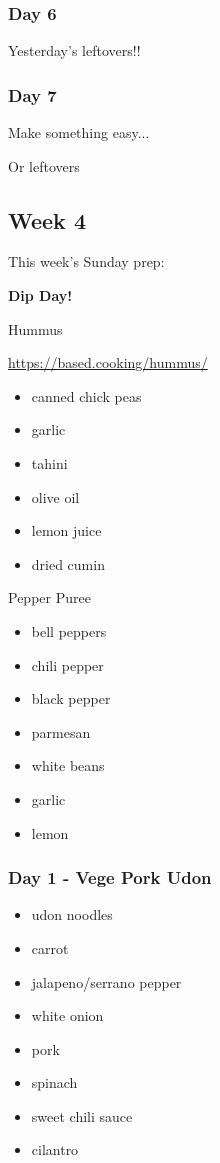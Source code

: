 \documentclass[11pt, a4paper]{article}
\begin{document}
\subsubsection{Day 6}
\vspace{1pc}
Yesterday's leftovers!!

\subsubsection{Day 7}
\vspace{1pc}
\noindent Make something easy...
\par
Or leftovers


\vspace{0.917 pc} %


\pagebreak
\subsection{Week 4}

This week's Sunday prep:
\par
\vspace{1pc}
\noindent\textbf{Dip Day!}
\par
Hummus
\par
\small{\url{https://based.cooking/hummus/}}
\par
\begin{itemize}
\item canned chick peas
\item garlic
\item tahini
\item olive oil
\item lemon juice
\item dried cumin
\end{itemize}

\vspace{1pc}

Pepper Puree
\begin{itemize}
\item bell peppers
\item chili pepper
\item black pepper
\item parmesan
\item white beans
\item garlic
\item lemon
\end{itemize}

\subsubsection{Day 1 - Vege Pork Udon}
\vspace{1pc}
\begin{itemize}
\item udon noodles
\item carrot
\item jalapeno/serrano pepper
\item white onion
\item pork
\item spinach
\item sweet chili sauce
\item cilantro
\end{itemize}
\end{document}
